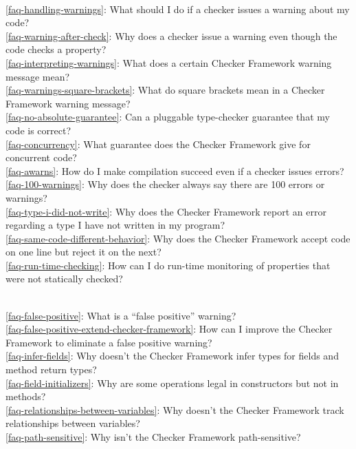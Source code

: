 \\ \ref{faq-handling-warnings}: What should I do if a checker issues a warning about my code?
\\ \ref{faq-warning-after-check}: Why does a checker issue a warning even though the code checks a property?
\\ \ref{faq-interpreting-warnings}: What does a certain Checker Framework warning message mean?
\\ \ref{faq-warnings-square-brackets}: What do square brackets mean in a Checker Framework warning message?
\\ \ref{faq-no-absolute-guarantee}: Can a pluggable type-checker guarantee that my code is correct?
\\ \ref{faq-concurrency}: What guarantee does the Checker Framework give for concurrent code?
\\ \ref{faq-awarns}: How do I make compilation succeed even if a checker issues errors?
\\ \ref{faq-100-warnings}: Why does the checker always say there are 100 errors or warnings?
\\ \ref{faq-type-i-did-not-write}: Why does the Checker Framework report an error regarding a type I have not written in my program?
\\ \ref{faq-same-code-different-behavior}: Why does the Checker Framework accept code on one line but reject it on the next?
\\ \ref{faq-run-time-checking}: How can I do run-time monitoring of properties that were not statically checked?

\\ \ref{faq-false-positive}: What is a ``false positive'' warning?
\\ \ref{faq-false-positive-extend-checker-framework}: How can I improve the Checker Framework to eliminate a false positive warning?
\\ \ref{faq-infer-fields}: Why doesn't the Checker Framework infer types for fields and method return types?
\\ \ref{faq-field-initializers}: Why are some operations legal in constructors but not in methods?
\\ \ref{faq-relationships-between-variables}: Why doesn't the Checker Framework track relationships between variables?
\\ \ref{faq-path-sensitive}: Why isn't the Checker Framework path-sensitive?

